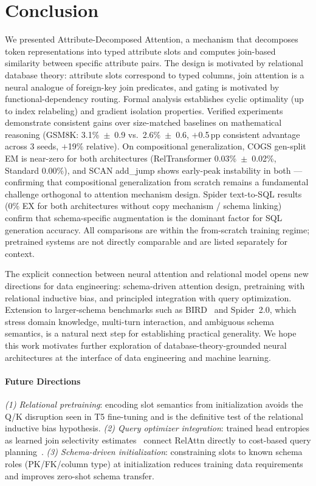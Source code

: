 \documentclass[conference]{IEEEtran}
\begin{document}
\section{Conclusion}
\label{sec:conclusion}

We presented Attribute-Decomposed Attention, a mechanism that decomposes token representations into typed attribute slots and computes join-based similarity between specific attribute pairs. The design is motivated by relational database theory: attribute slots correspond to typed columns, join attention is a neural analogue of foreign-key join predicates, and gating is motivated by functional-dependency routing. Formal analysis establishes cyclic optimality (up to index relabeling) and gradient isolation properties. Verified experiments demonstrate consistent gains over size-matched baselines on mathematical reasoning (GSM8K: 3.1\%~$\pm$~0.9 vs.\ 2.6\%~$\pm$~0.6, $+$0.5\,pp consistent advantage across 3 seeds, $+$19\% relative). On compositional generalization, COGS gen-split EM is near-zero for both architectures (RelTransformer 0.03\%~$\pm$~0.02\%, Standard 0.00\%), and SCAN add\_jump shows early-peak instability in both --- confirming that compositional generalization from scratch remains a fundamental challenge orthogonal to attention mechanism design. Spider text-to-SQL results (0\% EX for both architectures without copy mechanism / schema linking) confirm that schema-specific augmentation is the dominant factor for SQL generation accuracy. All comparisons are within the from-scratch training regime; pretrained systems are not directly comparable and are listed separately for context.

The explicit connection between neural attention and relational model opens new directions for data engineering: schema-driven attention design, pretraining with relational inductive bias, and principled integration with query optimization. Extension to larger-schema benchmarks such as BIRD~\cite{li2023bird} and Spider~2.0, which stress domain knowledge, multi-turn interaction, and ambiguous schema semantics, is a natural next step for establishing practical generality. We hope this work motivates further exploration of database-theory-grounded neural architectures at the interface of data engineering and machine learning.

\paragraph{Future Directions}
\emph{(1) Relational pretraining}: encoding slot semantics from initialization avoids the Q/K disruption seen in T5 fine-tuning and is the definitive test of the relational inductive bias hypothesis. \emph{(2) Query optimizer integration}: trained head entropies as learned join selectivity estimates~\cite{li2023alece,zeng2024price} connect RelAttn directly to cost-based query planning~\cite{li2022icde}. \emph{(3) Schema-driven initialization}: constraining slots to known schema roles (PK/FK/column type) at initialization reduces training data requirements and improves zero-shot schema transfer.
\end{document}
